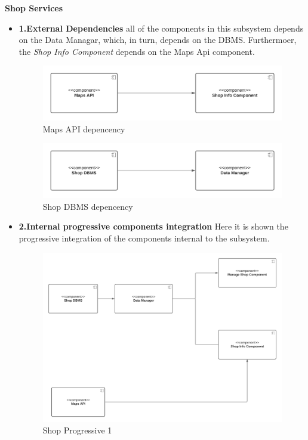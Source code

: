 \textbf{Shop Services}
\begin{itemize}
    \item \textbf{1.External Dependencies}
     all of the components in this subsystem depends on the Data Managar, which, in turn, depends on the DBMS. Furthermoer, the \textit{Shop Info Component}  depends on the Maps Api component.
    \begin{figure}[h!]
        \centering
        \includegraphics[width=.8\textwidth]{Images/TestDiagram/Shop/maps.png}
        \caption{\label{fig:ShopExternalDepMAPS}{Maps API depencency}}
    \end{figure}
    \FloatBarrier  
    
    \begin{figure}[h!]
        \centering
        \includegraphics[width=.8\textwidth]{Images/TestDiagram/Shop/data.png}
        \caption{\label{fig:ShopExternalDepDBMS}{Shop DBMS depencency}}
    \end{figure}
    \FloatBarrier
    \item \textbf{2.Internal progressive components integration} Here it is shown the progressive integration of the components internal to the subsystem.
    \begin{figure}[h!]
        \centering
        \includegraphics[width=1\textwidth]{Images/TestDiagram/Shop/2Shop(1).png}
        \caption{\label{fig:Shopinternal}{Shop Progressive 1}}
    \end{figure}
    \FloatBarrier  
\end{itemize}

